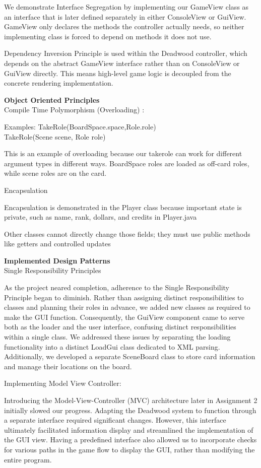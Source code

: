 \documentclass[12pt]{article}
\begin{document}
We demonstrate Interface Segregation by implementing our GameView class as an interface that is later defined separately in either ConsoleView or GuiView. GameView only declares the methods the controller actually needs, so neither implementing class is forced to depend on methods it does not use.

Dependency Inversion Principle is used within the Deadwood controller, which depends on the abstract GameView interface rather than on ConsoleView or GuiView directly. This means high-level game logic is decoupled from the concrete rendering implementation.

\textbf {Object Oriented Principles} \\
Compile Time Polymorphism (Overloading) :

Examples:
TakeRole(BoardSpace.space,Role.role) \\
TakeRole(Scene scene, Role role) 

This is an example of overloading because our takerole can work for different argument types in different ways. BoardSpace roles are loaded as off-card roles, while scene roles are on the card.

Encapsulation

Encapsulation is demonstrated in the Player class because important state is private, such as name, rank, dollars, and credits in Player.java

Other classes cannot directly change those fields; they must use public methods like getters and controlled updates

\textbf{Implemented Design Patterns}\\
    Single Responsibility Principles

    As the project neared completion, adherence to the Single Responsibility Principle began to diminish. Rather than  assigning distinct responsibilities to classes and planning their roles in advance, we added new classes as required to make the GUI function. Consequently, the GuiView component came to serve both as the loader and the user interface, confusing distinct responsibilities within a single class.
    We addressed these issues by separating the loading functionality into a distinct LoadGui class dedicated to XML parsing. Additionally, we developed a separate SceneBoard class to store card information and manage their locations on the board.

    

    Implementing Model View Controller:

    Introducing the Model-View-Controller (MVC) architecture later in Assignment 2 initially slowed our progress. Adapting the Deadwood system to function through a separate interface required significant changes. However, this interface ultimately facilitated information display and streamlined the implementation of the GUI view. Having a predefined interface also allowed us to incorporate checks for various paths in the game flow to display the GUI, rather than modifying the entire program.
\end{document}
